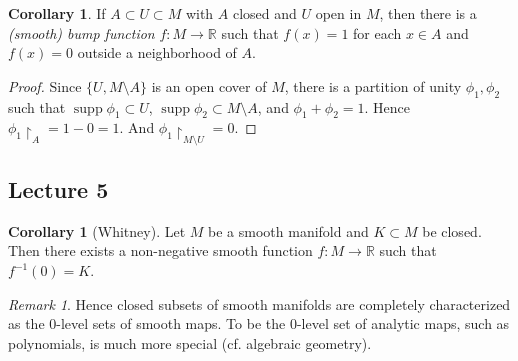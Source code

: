 \documentclass[10pt,letterpaper,cm]{nupset}
\theoremstyle{definition}
\theoremstyle{theorem}
\newtheorem{corollary}[definition]{Corollary}
\theoremstyle{remark}
\newtheorem{remark}[definition]{Remark}
\newcommand{\R}{\mathbb R}
\newcommand{\1}{\mathbf{1}}
\newcommand{\0}{\vec 0}
\DeclareMathOperator{\supp}{supp}
\begin{document}
\begin{corollary}
If $A \subset U \subset M$ with $A$ closed and $U$ open in $M$, then there is a  \textit{(smooth) bump function} $f: M \to \R$ such that $f(x) = 1$ for each $x\in A$ and $f(x) =0$ outside a neighborhood of $A$.
\end{corollary}

\begin{proof}
Since $\{U, M \setminus A\}$ is an open cover of $M$, there is a partition of unity $\phi_1, \phi_2$ such that $\supp \phi_1 \subset U$, $\supp \phi_2 \subset M \setminus A$, and $\phi_1 + \phi_2 = 1$. Hence $\phi_1 \restriction_A = 1 - 0 = 1$. And $\phi_1 \restriction_{M\setminus U} = 0$.
\end{proof}

\subsection{Lecture 5}

\begin{corollary}[Whitney]
Let $M$ be a smooth manifold and $K \subset M$ be closed. Then there exists a non-negative smooth function $f: M \to \R$ such that $f^{-1}(0) =K$.
\end{corollary}

\begin{remark}
Hence closed subsets of smooth manifolds are completely characterized as the $0$-level sets of smooth maps. To be the $0$-level set of analytic maps, such as polynomials, is much more special (cf. algebraic geometry).
\end{remark}
\end{document}
